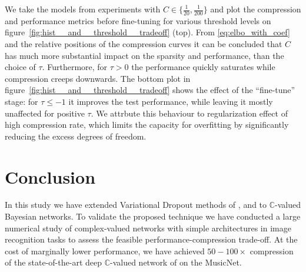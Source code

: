 \documentclass[a4paper,10pt,onecolumn]{article}
\newcommand{\cplx}{\mathbb{C}}
\begin{document}
We take the models from experiments with $C \in \{\tfrac1{20}, \frac1{200}\}$ and plot
the compression and performance metrics before fine-tuning for various threshold levels
on figure~\ref{fig:hist__and__threshold__tradeoff} (top). From \eqref{eq:elbo_with_coef} and
the relative positions of the compression curves it can be concluded that $C$ has much
more substantial impact on the sparsity and performance, than the choice of $\tau$.
Furthermore, for $\tau > 0$ the performance quickly saturates while compression creeps
downwards.
%
The bottom plot in figure~\ref{fig:hist__and__threshold__tradeoff} shows the effect of
the ``fine-tune'' stage: for $\tau \leq -1$ it improves the test performance, while leaving
it mostly unaffected for positive $\tau$. We attrbute this behaviour to regularization
effect of high compression rate, which limits the capacity for overfitting by significantly
reducing the excess degrees of freedom.





\section{Conclusion} %
\label{sec:conclusion}

In this study we have extended Variational Dropout methods of \citet{kingma_variational_2015},
\citet{molchanov_variational_2017} and \citet{kharitonov_variational_2018} to $\cplx$-valued
Bayesian networks. To validate the proposed technique we have conducted a large numerical
study of complex-valued networks with simple architectures in image recognition tasks to
assess the feasible performance-compression trade-off. At the cost of marginally lower performance,
we have achieved $50-100\times$ compression of the state-of-the-art deep $\cplx$-valued network
of \citet{trabelsi_deep_2017} on the MusicNet.
\end{document}
